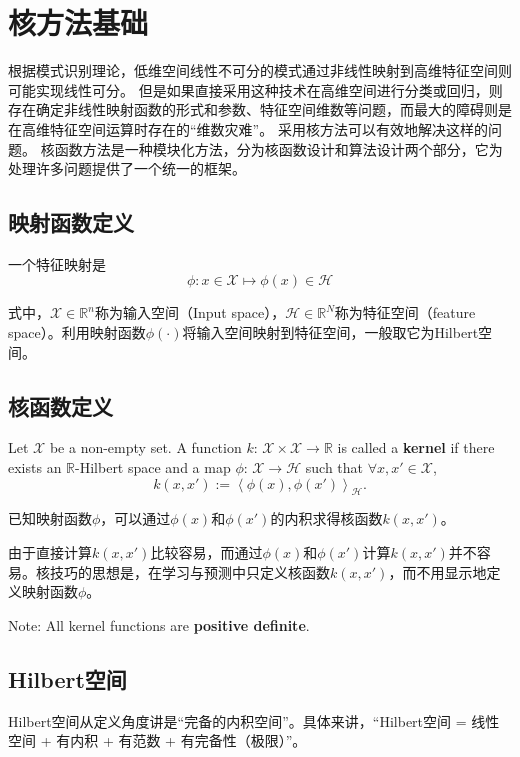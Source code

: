 \documentclass{ctexart}
\begin{document}
    \section{核方法基础}
    根据模式识别理论，低维空间线性不可分的模式通过非线性映射到高维特征空间则可能实现线性可分。
    但是如果直接采用这种技术在高维空间进行分类或回归，则存在确定非线性映射函数的形式和参数、特征空间维数等问题，而最大的障碍则是在高维特征空间运算时存在的“维数灾难”。
    采用核方法可以有效地解决这样的问题。
    核函数方法是一种模块化方法，分为核函数设计和算法设计两个部分，它为处理许多问题提供了一个统一的框架。
    
    \subsection{映射函数定义}
    一个特征映射是
    \begin{equation}
        \phi:x\in{\mathcal{X}}\mapsto\phi(x)\in{\mathcal{H}}
    \end{equation}

    式中，$\mathcal{X}\in{\mathbb{R}^n}$称为输入空间（Input space），$\mathcal{H}\in{\mathbb{R}^N}$称为特征空间（feature space）。利用映射函数$\phi(\cdot)$将输入空间映射到特征空间，一般取它为Hilbert空间。
    
    \subsection{核函数定义}
    Let $\mathcal{X}$ be a non-empty set. 
    A function $k$: $\mathcal{X}\times\mathcal{X}\rightarrow\mathbb{R}$ is called a \textbf{kernel} if there exists an $\mathbb{R}$-Hilbert space and a map $\phi$: $\mathcal{X}\rightarrow\mathcal{H}$ such that $\forall x, x'\in{\mathcal{X}}$,
    \begin{equation}
        k(x, x') := \left<\phi(x), \phi(x')\right>_{\mathcal{H}}.
    \end{equation} 

    已知映射函数$\phi$，可以通过$\phi(x)$和$\phi(x')$的内积求得核函数$k(x, x')$。

    由于直接计算$k(x, x')$比较容易，而通过$\phi(x)$和$\phi(x')$计算$k(x, x')$并不容易。核技巧的思想是，在学习与预测中只定义核函数$k(x, x')$，而不用显示地定义映射函数$\phi$。

    Note: All kernel functions are \textbf{positive definite}.   
    
    \subsection{Hilbert空间}
    Hilbert空间从定义角度讲是“完备的内积空间”。具体来讲，“Hilbert空间 = 线性空间 + 有内积 + 有范数 + 有完备性（极限）”。
\end{document}
